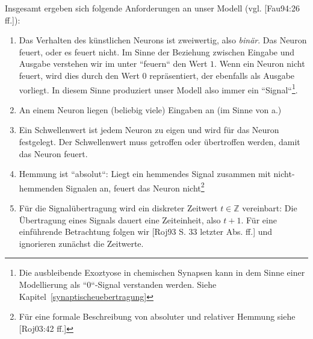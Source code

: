 Insgesamt ergeben sich folgende Anforderungen an unser Modell (vgl. [Fau94:26 ff.]):

\begin{enumerate}
    \item Das Verhalten des künstlichen Neurons ist zweiwertig, also \textit{binär}. Das Neuron feuert, oder es feuert nicht. Im Sinne der Beziehung zwischen Eingabe und Ausgabe verstehen wir im unter ``feuern`` den Wert $1$. Wenn ein Neuron nicht feuert, wird dies durch den Wert $0$ repräsentiert, der ebenfalls als Ausgabe vorliegt. In diesem Sinne produziert unser Modell also immer ein ``Signal``\footnote{
        Die ausbleibende Exoztyose in chemischen Synapsen kann in dem Sinne einer Modellierung als ``0``-Signal verstanden werden. Siehe Kapitel~\ref{synaptischeuebertragung}
    }.
    \item An einem Neuron liegen (beliebig viele) Eingaben an (im Sinne von a.)
    \item Ein Schwellenwert ist jedem Neuron zu eigen und wird für das Neuron festgelegt. Der Schwellenwert muss getroffen oder übertroffen werden, damit das Neuron feuert.
    \item Hemmung ist ``absolut``: Liegt ein hemmendes Signal zusammen mit nicht-hemmenden Signalen an, feuert das Neuron nicht\footnote{
        Für eine formale Beschreibung von absoluter und relativer Hemmung siehe [Roj03:42 ff.]
    }
    \item Für die Signalübertragung wird ein diskreter Zeitwert $t \in \mathbb{Z}$ vereinbart: Die Übertragung eines Signals dauert eine Zeiteinheit, also $t + 1$. Für eine einführende Betrachtung folgen wir [Roj93 S. 33 letzter Abs. ff.] und ignorieren zunächst die Zeitwerte.
\end{enumerate}


